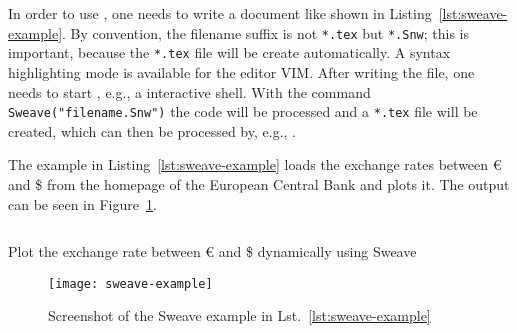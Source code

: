 In order to use , one needs to write a document like shown in
Listing~\ref{lst:sweave-example}.  By convention, the filename suffix is not
\texttt{*.tex} but \texttt{*.Snw}; this is important, because the \texttt{*.tex}
file will be create automatically.  A syntax highlighting mode is available for
the editor VIM\@.  After writing the file, one needs to start ,
e.g., a  interactive shell.  With the command
\texttt{Sweave("filename.Snw")} the  code will be processed
and a \texttt{*.tex} file will be created, which can then be processed by, e.g.,
.

The example in Listing~\ref{lst:sweave-example} loads the exchange rates between
\euro{} and \$ from the homepage of the European Central Bank and plots it. The
output can be seen in Figure~\ref{fig:sweave-example}.

\begin{listing}[H]
  \inputminted{latex}{../examples/sweave-example.Snw}
  \caption{Plot the exchange rate between \euro{} and \$ dynamically using
    Sweave}
  \label{lst:sweave-example}
\end{listing}
\begin{figure}[!t]
  \texttt{[image: sweave-example]}
  \caption{Screenshot of the Sweave example in Lst.~\ref{lst:sweave-example}}
  \label{fig:sweave-example}
\end{figure}
